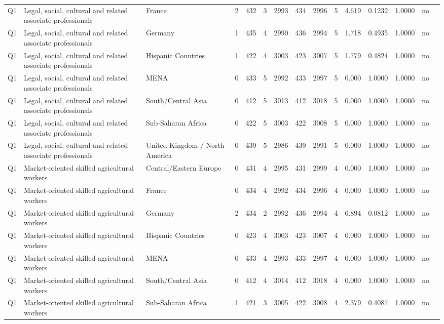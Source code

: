 \begin{longtable}{lllrcccccccccll}
Q1 & Legal, social, cultural and related associate professionals & France & 2 & 432 & 3 & 2993 & 434 & 2996 & 5 & 4.619 & 0.1232 & 1.0000 & no \\
Q1 & Legal, social, cultural and related associate professionals & Germany & 1 & 435 & 4 & 2990 & 436 & 2994 & 5 & 1.718 & 0.4935 & 1.0000 & no \\
Q1 & Legal, social, cultural and related associate professionals & Hispanic Countries & 1 & 422 & 4 & 3003 & 423 & 3007 & 5 & 1.779 & 0.4824 & 1.0000 & no \\
Q1 & Legal, social, cultural and related associate professionals & MENA & 0 & 433 & 5 & 2992 & 433 & 2997 & 5 & 0.000 & 1.0000 & 1.0000 & no \\
Q1 & Legal, social, cultural and related associate professionals & South/Central Asia & 0 & 412 & 5 & 3013 & 412 & 3018 & 5 & 0.000 & 1.0000 & 1.0000 & no \\
Q1 & Legal, social, cultural and related associate professionals & Sub-Saharan Africa & 0 & 422 & 5 & 3003 & 422 & 3008 & 5 & 0.000 & 1.0000 & 1.0000 & no \\
Q1 & Legal, social, cultural and related associate professionals & United Kingdom / North America & 0 & 439 & 5 & 2986 & 439 & 2991 & 5 & 0.000 & 1.0000 & 1.0000 & no \\
Q1 & Market-oriented skilled agricultural workers & Central/Eastern Europe & 0 & 431 & 4 & 2995 & 431 & 2999 & 4 & 0.000 & 1.0000 & 1.0000 & no \\
Q1 & Market-oriented skilled agricultural workers & France & 0 & 434 & 4 & 2992 & 434 & 2996 & 4 & 0.000 & 1.0000 & 1.0000 & no \\
Q1 & Market-oriented skilled agricultural workers & Germany & 2 & 434 & 2 & 2992 & 436 & 2994 & 4 & 6.894 & 0.0812 & 1.0000 & no \\
Q1 & Market-oriented skilled agricultural workers & Hispanic Countries & 0 & 423 & 4 & 3003 & 423 & 3007 & 4 & 0.000 & 1.0000 & 1.0000 & no \\
Q1 & Market-oriented skilled agricultural workers & MENA & 0 & 433 & 4 & 2993 & 433 & 2997 & 4 & 0.000 & 1.0000 & 1.0000 & no \\
Q1 & Market-oriented skilled agricultural workers & South/Central Asia & 0 & 412 & 4 & 3014 & 412 & 3018 & 4 & 0.000 & 1.0000 & 1.0000 & no \\
Q1 & Market-oriented skilled agricultural workers & Sub-Saharan Africa & 1 & 421 & 3 & 3005 & 422 & 3008 & 4 & 2.379 & 0.4087 & 1.0000 & no \\

\end{longtable}
